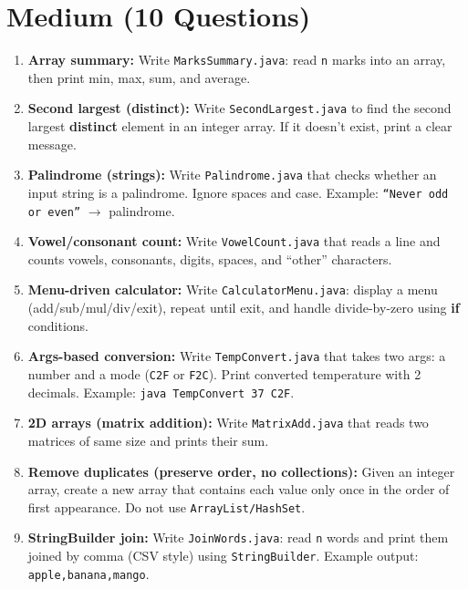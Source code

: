 \documentclass[11pt,a4paper]{article}
\begin{document}
\section*{Medium (10 Questions)}
\begin{enumerate}[label=M\arabic*., leftmargin=*]
  \item \textbf{Array summary:} Write \texttt{MarksSummary.java}:
    read \texttt{n} marks into an array, then print min, max, sum, and average.

  \item \textbf{Second largest (distinct):} Write \texttt{SecondLargest.java} to find the second largest \textbf{distinct} element
    in an integer array. If it doesn't exist, print a clear message.

  \item \textbf{Palindrome (strings):} Write \texttt{Palindrome.java} that checks whether an input string is a palindrome.
    Ignore spaces and case. Example: \texttt{``Never odd or even''} $\rightarrow$ palindrome.

  \item \textbf{Vowel/consonant count:} Write \texttt{VowelCount.java} that reads a line and counts vowels, consonants,
    digits, spaces, and ``other'' characters.

  \item \textbf{Menu-driven calculator:} Write \texttt{CalculatorMenu.java}:
    display a menu (add/sub/mul/div/exit), repeat until exit, and handle divide-by-zero using \textbf{if} conditions.

  \item \textbf{Args-based conversion:} Write \texttt{TempConvert.java} that takes two args:
    a number and a mode (\texttt{C2F} or \texttt{F2C}). Print converted temperature with 2 decimals.
    Example: \texttt{java TempConvert 37 C2F}.

  \item \textbf{2D arrays (matrix addition):} Write \texttt{MatrixAdd.java} that reads two matrices of same size
    and prints their sum.

  \item \textbf{Remove duplicates (preserve order, no collections):} Given an integer array, create a new array
    that contains each value only once in the order of first appearance. Do not use \texttt{ArrayList/HashSet}.

  \item \textbf{StringBuilder join:} Write \texttt{JoinWords.java}:
    read \texttt{n} words and print them joined by comma (CSV style) using \texttt{StringBuilder}.
    Example output: \texttt{apple,banana,mango}.


\end{enumerate}
\end{document}
